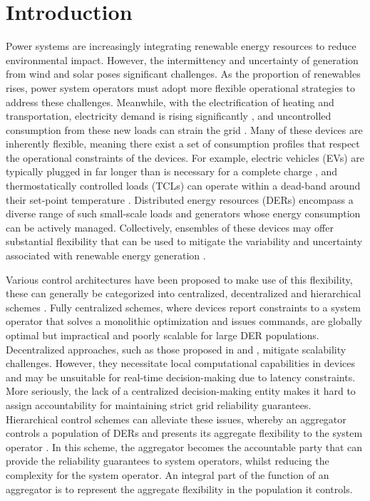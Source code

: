 \section{Introduction}

Power systems are increasingly integrating renewable energy resources to reduce environmental impact.
However, the intermittency and uncertainty of generation from wind and solar poses significant challenges. As the proportion of renewables rises, power system operators must adopt more flexible operational strategies to address these challenges. Meanwhile, with the electrification of heating and transportation, electricity demand is rising significantly \cite{Baruah2014EnergyElectrification}, and uncontrolled consumption from these new loads can strain the grid \cite{Lopes2011IntegrationSystem}. Many of these devices are inherently flexible, meaning there exist a set of consumption profiles that respect the operational constraints of the devices. For example, electric vehicles (EVs) are typically plugged in far longer than is necessary for a complete charge \cite{Lee2019ACN-Data:Dataset}, and thermostatically controlled loads (TCLs) can operate within a dead-band around their set-point temperature \cite{Callaway2009TappingEnergy}.
Distributed energy resources (DERs) encompass a diverse range of such small-scale loads and generators whose energy consumption can be actively managed.
Collectively, ensembles of these devices may offer substantial flexibility that can be used to mitigate the variability and uncertainty associated with renewable energy generation \cite{Almassalkhi2023IntelligentDecarbonization}.

Various control architectures have been proposed to make use of this flexibility, these can generally be categorized into centralized, decentralized and hierarchical schemes \cite{Callaway2011AchievingLoads}.
Fully centralized schemes, where devices report constraints to a system operator that solves a monolithic optimization and issues commands, are globally optimal but impractical and poorly scalable for large DER populations.
Decentralized approaches, such as those proposed in \cite{Tindemans2015DecentralizedResponse} and \cite{Gan2012OptimalCharging}, mitigate scalability challenges. However, they necessitate local computational capabilities in devices and may be unsuitable for real-time decision-making due to latency constraints. More seriously, the lack of a centralized decision-making entity makes it hard to assign accountability for maintaining strict grid reliability guarantees. Hierarchical control schemes can alleviate these issues, whereby an aggregator controls a population of DERs and presents its aggregate flexibility to the system operator \cite{Xu2016HierarchicalLoads}. In this scheme, the aggregator becomes the accountable party that can provide the reliability guarantees to system operators, whilst reducing the complexity for the system operator. An integral part of the function of an aggregator is to represent the aggregate flexibility in the population it controls.  

